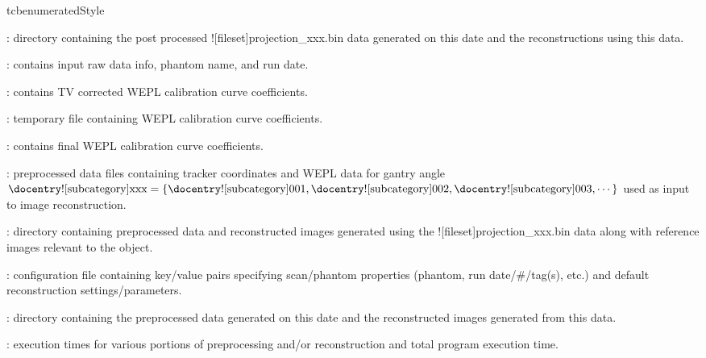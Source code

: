 \begin{tcbenvironment}
\begin{tcbparbox}{tcbenumeratedStyle}
\begin{ThinEnum}
\begin{ThinEnum}
\begin{ThinEnum}
\begin{ThinEnum}
\begin{ThinEnum}
                        \begin{ThinEnum}
                            \item {} : directory containing the post processed \docentry![fileset]{projection\_xxx.bin} data generated on this date and the reconstructions using this data.
                            \begin{ThinEnum}
                                \item {} : contains input raw data info, phantom name, and run date.
                                \item {} : contains TV corrected WEPL calibration curve coefficients.
                        \item {} : temporary file containing WEPL calibration curve coefficients.
                                    \item {} : contains final WEPL calibration curve coefficients.
                                \item {} : preprocessed data files containing tracker coordinates and WEPL data for gantry angle $\text{\docentry![subcategory]{xxx}} =\{\text{\docentry![subcategory]{001}}, \text{\docentry![subcategory]{002}}, \text{\docentry![subcategory]{003}}, \cdots\}$ used as input to image reconstruction.
                                \item {} : directory containing preprocessed data and reconstructed images generated using the \docentry![fileset]{projection\_xxx.bin} data along with reference images relevant to the object.
                                    \begin{ThinEnum}
                                        \item {} : configuration file containing key/value pairs specifying scan/phantom properties (phantom, run date/\#/tag(s), etc.) and default reconstruction settings/parameters.
                                    \item {} : directory containing the preprocessed data generated on this date and the reconstructed images generated from this data.
                                \begin{ThinEnum}
                                            \item {} : execution times for various portions of preprocessing and/or reconstruction and total program execution time.

\end{ThinEnum}
\end{ThinEnum}
\end{ThinEnum}
\end{ThinEnum}
\end{ThinEnum}
\end{ThinEnum}
\end{ThinEnum}
\end{ThinEnum}
\end{ThinEnum}
\end{tcbparbox}
\end{tcbenvironment}
